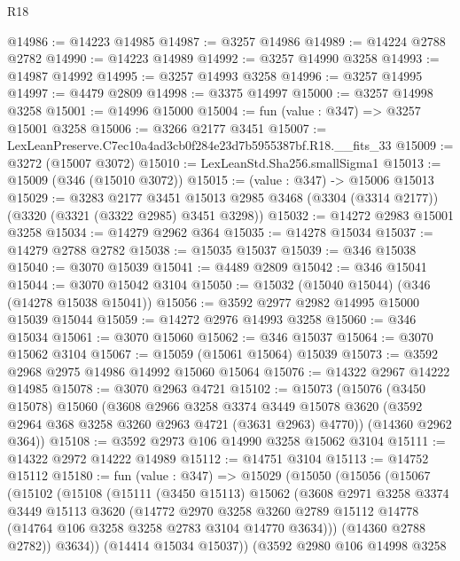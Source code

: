 \begin{lexlean}{R18}
\begin{coremodule}
@14986 := @14223 @14985
@14987 := @3257 @14986
@14989 := @14224 @2788 @2782
@14990 := @14223 @14989
@14992 := @3257 @14990 @3258
@14993 := @14987 @14992
@14995 := @3257 @14993 @3258
@14996 := @3257 @14995
@14997 := @4479 @2809
@14998 := @3375 @14997
@15000 := @3257 @14998 @3258
@15001 := @14996 @15000
@15004 := fun (value : @347) => @3257 @15001 @3258
@15006 := @3266 @2177 @3451
@15007 := LexLeanPreserve.C7ec10a4ad3cb0f284e23d7b5955387bf.R18.__fits_33
@15009 := @3272 (@15007 @3072)
@15010 := LexLeanStd.Sha256.smallSigma1
@15013 := @15009 (@346 (@15010 @3072))
@15015 := (value : @347) -> @15006 @15013
@15029 := @3283
    @2177
    @3451
    @15013
    @2985
    @3468
    (@3304 (@3314 @2177))
    (@3320 (@3321 (@3322 @2985) @3451 @3298))
@15032 := @14272 @2983 @15001 @3258
@15034 := @14279 @2962 @364
@15035 := @14278 @15034
@15037 := @14279 @2788 @2782
@15038 := @15035 @15037
@15039 := @346 @15038
@15040 := @3070 @15039
@15041 := @4489 @2809
@15042 := @346 @15041
@15044 := @3070 @15042 @3104
@15050 := @15032 (@15040 @15044) (@346 (@14278 @15038 @15041))
@15056 := @3592 @2977 @2982 @14995 @15000 @15039 @15044
@15059 := @14272 @2976 @14993 @3258
@15060 := @346 @15034
@15061 := @3070 @15060
@15062 := @346 @15037
@15064 := @3070 @15062 @3104
@15067 := @15059 (@15061 @15064) @15039
@15073 := @3592 @2968 @2975 @14986 @14992 @15060 @15064
@15076 := @14322 @2967 @14222 @14985
@15078 := @3070 @2963 @4721
@15102 := @15073
    (@15076
      (@3450 @15078)
      @15060
      (@3608
        @2966
        @3258
        @3374
        @3449
        @15078
        @3620
        (@3592 @2964 @368 @3258 @3260 @2963 @4721 (@3631 @2963) @4770))
      (@14360 @2962 @364))
@15108 := @3592 @2973 @106 @14990 @3258 @15062 @3104
@15111 := @14322 @2972 @14222 @14989
@15112 := @14751 @3104
@15113 := @14752 @15112
@15180 := fun (value : @347) =>
  @15029
    (@15050
      (@15056
        (@15067
          (@15102
            (@15108
              (@15111
                (@3450 @15113)
                @15062
                (@3608
                  @2971
                  @3258
                  @3374
                  @3449
                  @15113
                  @3620
                  (@14772
                    @2970
                    @3258
                    @3260
                    @2789
                    @15112
                    @14778
                    (@14764 @106 @3258 @3258 @2783 @3104 @14770 @3634)))
                (@14360 @2788 @2782))
              @3634))
          (@14414 @15034 @15037))
        (@3592
          @2980
          @106
          @14998
          @3258

\end{coremodule}
\end{lexlean}
